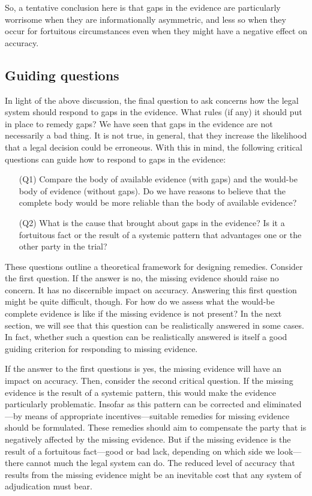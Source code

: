 \documentclass[
  10pt,
  dvipsnames,enabledeprecatedfontcommands]{scrartcl}
\begin{document}
So, a tentative conclusion here is that gaps in the evidence are
particularly worrisome when they are informationally asymmetric, and
less so when they occur for fortuitous circumstances even when they
might have a negative effect on accuracy.

\hypertarget{guiding-questions}{%
\subsection{Guiding questions}\label{guiding-questions}}

In light of the above discussion, the final question to ask concerns how
the legal system should respond to gaps in the evidence. What rules (if
any) it should put in place to remedy gaps? We have seen that gaps in
the evidence are not necessarily a bad thing. It is not true, in
general, that they increase the likelihood that a legal decision could
be erroneous. With this in mind, the following critical questions can
guide how to respond to gaps in the evidence:

\begin{itemize}

\item[(Q1)] Compare the body of available evidence (with gaps) and the would-be body of evidence (without gaps). Do we have reasons to believe that the complete body would be more reliable than the body of available evidence? 

\item[(Q2)] What is the cause that brought about gaps in the evidence? Is it a fortuitous fact or the result of a systemic pattern that advantages one or the other party in the trial? 

\end{itemize}

\noindent These questions outline a theoretical framework for designing
remedies. Consider the first question. If the answer is no, the missing
evidence should raise no concern. It has no discernible impact on
accuracy. Answering this first question might be quite difficult,
though. For how do we assess what the would-be complete evidence is like
if the missing evidence is not present? In the next section, we will see
that this question can be realistically answered in some cases. In fact,
whether such a question can be realistically answered is itself a good
guiding criterion for responding to missing evidence.

If the answer to the first questions is yes, the missing evidence will
have an impact on accuracy. Then, consider the second critical question.
If the missing evidence is the result of a systemic pattern, this would
make the evidence particularly problematic. Insofar as this pattern can
be corrected and eliminated---by means of appropriate
incentives---suitable remedies for missing evidence should be
formulated. These remedies should aim to compensate the party that is
negatively affected by the missing evidence. But if the missing evidence
is the result of a fortuitous fact---good or bad lack, depending on
which side we look---there cannot much the legal system can do. The
reduced level of accuracy that results from the missing evidence might
be an inevitable cost that any system of adjudication must bear.
\end{document}
